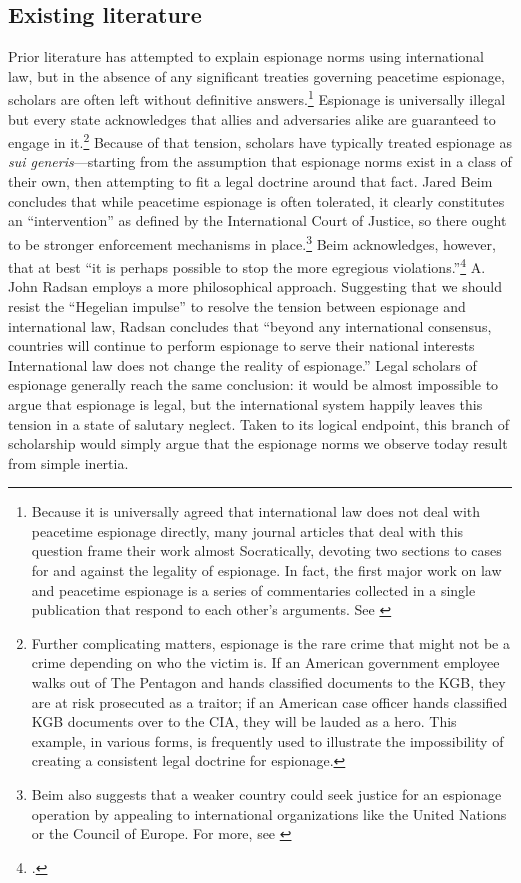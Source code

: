 \documentclass[14pt]{extarticle}
\begin{document}
\subsection{Existing literature}
Prior literature has attempted to explain espionage norms using international law, but in the absence of any significant treaties governing peacetime espionage, scholars are often left without definitive answers.\footnote{Because it is universally agreed that international law does not deal with peacetime espionage directly, many journal articles that deal with this question frame their work almost Socratically, devoting two sections to cases for and against the legality of espionage. In fact, the first major work on law and peacetime espionage is a series of commentaries collected in a single publication that respond to each other's arguments. See \cite{wright_essays_1962}} Espionage is universally illegal but every state acknowledges that allies and adversaries alike are guaranteed to engage in it.\footnote{Further complicating matters, espionage is the rare crime that might not be a crime depending on who the victim is. If an American government employee walks out of The Pentagon and hands classified documents to the KGB, they are at risk prosecuted as a traitor; if an American case officer hands classified KGB documents over to the CIA, they will be lauded as a hero. This example, in various forms, is frequently used to illustrate the impossibility of creating a consistent legal doctrine for espionage.} Because of that tension, scholars have typically treated espionage as \emph{sui generis}---starting from the assumption that espionage norms exist in a class of their own, then attempting to fit a legal doctrine around that fact. Jared Beim concludes that while peacetime espionage is often tolerated, it clearly constitutes an \enquote{intervention} as defined by the International Court of Justice, so there ought to be stronger enforcement mechanisms in place.\footnote{Beim also suggests that a weaker country could seek justice for an espionage operation by appealing to international organizations like the United Nations or the Council of Europe. For more, see \cite{beim_enforcing_2018}} Beim acknowledges, however, that at best \enquote{it is perhaps possible to stop the more egregious violations.}\footcite[p.~672]{beim_enforcing_2018} A. John Radsan employs a more philosophical approach. Suggesting that we should resist the \enquote{Hegelian impulse} to resolve the tension between espionage and international law, Radsan concludes that \enquote{beyond any international consensus, countries will continue to perform espionage to serve their national interests \textelp{} International law does not change the reality of espionage.} Legal scholars of espionage generally reach the same conclusion: it would be almost impossible to argue that espionage is legal, but the international system happily leaves this tension in a state of salutary neglect. Taken to its logical endpoint, this branch of scholarship would simply argue that the espionage norms we observe today result from simple inertia.
\end{document}
